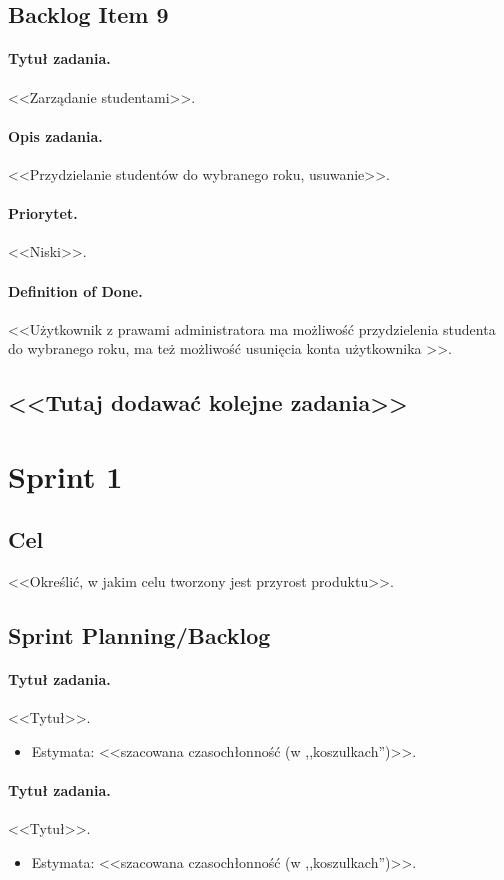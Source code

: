 \documentclass[a4paper]{article}
\begin{document}
\subsection{Backlog Item 9}
\paragraph{Tytuł zadania.} <<Zarządanie studentami>>.
\paragraph{Opis zadania.} <<Przydzielanie studentów do wybranego roku, usuwanie>>.
\paragraph{Priorytet.} <<Niski>>.
\paragraph{Definition of Done.} <<Użytkownik z prawami administratora ma możliwość przydzielenia studenta do wybranego roku, ma też możliwość usunięcia konta użytkownika >>.

\subsection*{<<Tutaj dodawać kolejne zadania>>}

\section{Sprint 1}
\subsection{Cel} <<Określić, w jakim celu tworzony jest przyrost produktu>>.
\subsection{Sprint Planning/Backlog}

\paragraph{Tytuł zadania.} <<Tytuł>>.
\begin{itemize}
\item Estymata: <<szacowana czasochłonność (w ,,koszulkach'')>>.
\end{itemize}

\paragraph{Tytuł zadania.} <<Tytuł>>.
\begin{itemize}
\item Estymata: <<szacowana czasochłonność (w ,,koszulkach'')>>.
\end{itemize}
\end{document}
